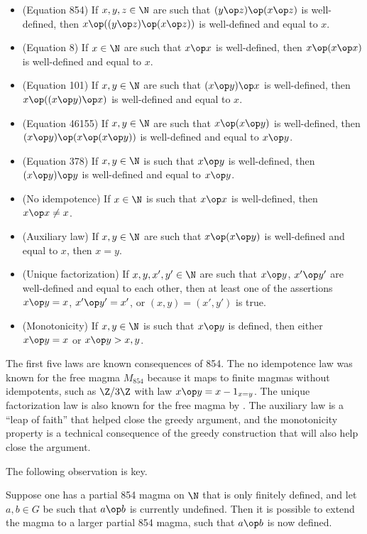 \begin{itemize}
  \item (Equation 854)  If $x,y,z \in \N$ are such that $(y \op z) \op (x \op z)$ is well-defined, then $x \op ((y \op z) \op (x \op z))$ is well-defined and equal to $x$.
  \item (Equation 8) If $x \in \N$ are such that $x \op x$ is well-defined, then $x \op (x \op x)$ is well-defined and equal to $x$.
  \item (Equation 101)  If $x,y \in \N$ are such that $(x \op y) \op x$ is well-defined, then $x \op ((x \op y) \op x)$ is well-defined and equal to $x$.
  \item (Equation 46155) If $x,y \in \N$ are such that $x \op (x \op y)$ is well-defined, then $(x \op y) \op (x \op (x \op y))$ is well-defined and equal to $x \op y$.
  \item (Equation 378) If $x,y \in \N$ is such that $x \op y$ is well-defined, then $(x \op y) \op y$ is well-defined and equal to $x \op y$.
  \item (No idempotence)  If $x \in \N$ is such that $x \op x$ is well-defined, then $x \op x \neq x$.
  \item (Auxiliary law)  If $x,y \in \N$ are such that $x \op (x \op y)$ is well-defined and equal to $x$, then $x=y$.
  \item (Unique factorization)  If $x,y,x',y' \in \N$ are such that $x \op y$, $x' \op y'$ are well-defined and equal to each other, then at least one of the assertions $x \op y = x$, $x' \op y' = x'$, or $(x,y) = (x',y')$ is true.
  \item (Monotonicity)  If $x,y \in \N$ is such that $x \op y$ is defined, then either $x \op y = x$ or $x \op y > x, y$.
\end{itemize}

The first five laws are known consequences of 854.  The no idempotence law was known for the free magma $M_{854}$ because it maps to finite magmas without idempotents, such as $\Z/3\Z$ with law $x \op y = x - 1_{x=y}$.  The unique factorization law is also known for the free magma by .  The auxiliary law is a ``leap of faith'' that helped close the greedy argument, and the monotonicity property is a technical consequence of the greedy construction that will also help close the argument.

The following observation is key.

\begin{proposition}\label{854-extend}\leanok{}  Suppose one has a partial 854 magma on $\N$ that is only finitely defined, and let $a,b \in G$ be such that $a \op b$ is currently undefined.  Then it is possible to extend the magma to a larger partial 854 magma, such that $a \op b$ is now defined.
\end{proposition}

